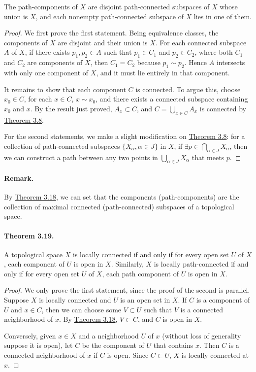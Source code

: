 \documentclass{article}
\numberwithin{equation}{section}
\theoremstyle{plain}
\theoremstyle{definition}
\begin{document}
The path-components of $X$ are disjoint path-connected subspaces of $X$ whose union is $X$, and each nonempty path-connected subspace of $X$ lies in one of them.
\begin{proof}
We first prove the first statement. Being equivalence classes, the components of $X$ are disjoint and their union is $X$. For each connected subspace $A$ of $X$, if there exists $p_1,p_2\in A$ such that $p_1\in C_1$ and $p_2\in C_2$, where both $C_1$ and $C_2$ are components of $X$, then $C_1=C_2$ because $p_1\sim p_2$. Hence $A$ intersects with only one component of $X$, and it must lie entirely in that component.

It remains to show that each component $C$ is connected. To argue this, choose $x_0\in C$, for each $x\in C$, $x\sim x_0$, and there exists a connected subspace containing $x_0$ and $x$. By the result just proved, $A_x\subset C$, and $C=\bigcup_{x\in C}A_x$ is connected by \hyperref[thm:3.8]{Theorem 3.8}.

For the second statements, we make a slight modification on \hyperref[thm:3.8]{Theorem 3.8}: for a collection of path-connected subspaces $\{X_\alpha,\alpha\in J\}$ in $X$, if $\exists p\in\bigcap_{\alpha\in J} X_\alpha$, then we can construct a path between any two points in $\bigcup_{\alpha\in J} X_\alpha$ that meets $p$.
\end{proof}

\paragraph{Remark.} By \hyperref[thm:3.18]{Theorem 3.18}, we can set that the components (path-components) are the collection of maximal connected (path-connected) subspaces of a topological space.

\paragraph{Theorem 3.19.\label{thm:3.19}} A topological space $X$ is locally connected if and only if for every open set $U$ of $X$, each component of $U$ is open in $X$. Similarly,  $X$ is locally path-connected if and only if for every open set $U$ of $X$, each path component of $U$ is open in $X$.

\begin{proof}
We only prove the first statement, since the proof of the second is parallel. Suppose $X$ is locally connected and $U$ is an open set in $X$. If $C$ is a component of $U$ and $x\in C$, then we can choose some $V\subset U$ such that $V$ is a connected neighborhood of $x$. By \hyperref[thm:3.18]{Theorem 3.18}, $V\subset C$, and $C$ is open in $X$.

Conversely, given $x\in X$ and a neighborhood $U$ of $x$ (without loss of generality suppose it is open), let $C$ be the component of $U$ that contains $x$. Then $C$ is a connected neighborhood of $x$ if $C$ is open. Since $C\subset U$, $X$ is locally connected at $x$.
\end{proof}
\end{document}
